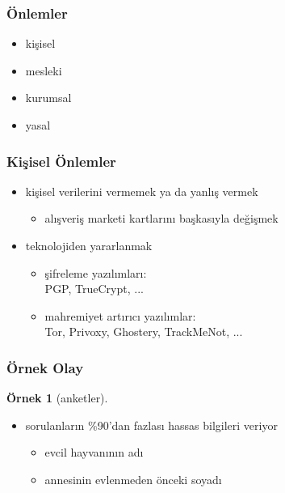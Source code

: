 \documentclass[dvipsnames]{beamer}
\theoremstyle{definition}
\theoremstyle{example}
\newtheorem{ornek}[theorem]{Örnek}
\theoremstyle{plain}
\begin{document}
\begin{frame}
  \frametitle{Önlemler}

  \begin{itemize}
    \item kişisel
    \item mesleki
    \item kurumsal
    \item yasal
  \end{itemize}
\end{frame}

\begin{frame}
  \frametitle{Kişisel Önlemler}

  \begin{itemize}
    \item kişisel verilerini vermemek ya da yanlış vermek
    \begin{itemize}
      \item alışveriş marketi kartlarını başkasıyla değişmek
    \end{itemize}

    \item teknolojiden yararlanmak
    \begin{itemize}
      \item şifreleme yazılımları:\\
        PGP, TrueCrypt, ...
      \item mahremiyet artırıcı yazılımlar:\\
        Tor, Privoxy, Ghostery, TrackMeNot, ...
    \end{itemize}
  \end{itemize}
\end{frame}

\begin{frame}
  \frametitle{Örnek Olay}

  \begin{ornek}[anketler]
    \begin{itemize}
      \item sorulanların \%90'dan fazlası hassas bilgileri veriyor
      \begin{itemize}
        \item evcil hayvanının adı
        \item annesinin evlenmeden önceki soyadı
      \end{itemize}
    \end{itemize}
  \end{ornek}
\end{frame}
\end{document}
